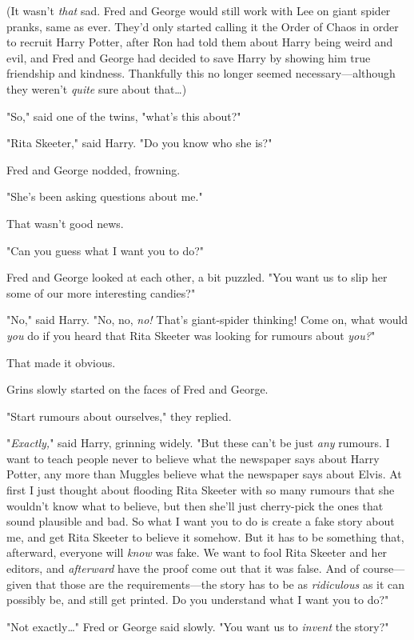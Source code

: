 (It wasn't \emph{that} sad. Fred and George would still work with Lee on giant
spider pranks, same as ever. They'd only started calling it the Order of Chaos
in order to recruit Harry Potter, after Ron had told them about Harry being
weird and evil, and Fred and George had decided to save Harry by showing him
true friendship and kindness. Thankfully this no longer seemed
necessary---although they weren't \emph{quite} sure about that{\ldots})

"So," said one of the twins, "what's this about?"

"Rita Skeeter," said Harry. "Do you know who she is?"

Fred and George nodded, frowning.

"She's been asking questions about me."

That wasn't good news.

"Can you guess what I want you to do?"

Fred and George looked at each other, a bit puzzled. "You want us to slip her
some of our more interesting candies?"

"No," said Harry. "No, no, \emph{no!} That's giant-spider thinking! Come on,
what would \emph{you} do if you heard that Rita Skeeter was looking for rumours
about \emph{you?}"

That made it obvious.

Grins slowly started on the faces of Fred and George.

"Start rumours about ourselves," they replied.

"\emph{Exactly,}" said Harry, grinning widely. "But these can't be just
\emph{any} rumours. I want to teach people never to believe what the newspaper
says about Harry Potter, any more than Muggles believe what the newspaper says
about Elvis. At first I just thought about flooding Rita Skeeter with so many
rumours that she wouldn't know what to believe, but then she'll just cherry-pick
the ones that sound plausible and bad. So what I want you to do is create a
fake story about me, and get Rita Skeeter to believe it somehow. But it has to
be something that, afterward, everyone will \emph{know} was fake. We want to
fool Rita Skeeter and her editors, and \emph{afterward} have the proof come out
that it was false. And of course---given that those are the requirements---the
story has to be as \emph{ridiculous} as it can possibly be, and still get
printed. Do you understand what I want you to do?"

"Not exactly{\ldots}" Fred or George said slowly. "You want us to \emph{invent}
the story?"

